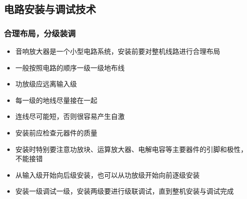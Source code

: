 \documentclass[a4paper,11pt,UTF8]{article}
\numberwithin{equation}{subsection}
\begin{document}
\subsection{电路安装与调试技术}

\subsubsection{合理布局，分级装调}
\begin{itemize}
	\setlength{\itemsep}{0pt}
	\item 音响放大器是一个小型电路系统，安装前要对整机线路进行合理布局
	\item 一般按照电路的顺序一级一级地布线
	\item 功放级应远离输入级
	\item 每一级的地线尽量接在一起
	\item 连线尽可能短，否则很容易产生自激
	\item 安装前应检查元器件的质量
	\item 安装时特别要注意功放块、运算放大器、电解电容等主要器件的引脚和极性，不能接错
	\item 从输入级开始向后级安装，也可以从功放级开始向前逐级安装
	\item 安装一级调试一级，安装两级要进行级联调试，直到整机安装与调试完成
\end{itemize}
\end{document}
